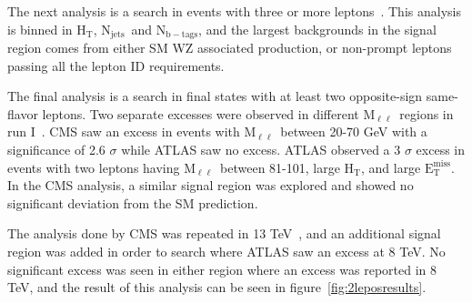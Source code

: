 \documentclass{article}
\newcommand{\MET}{${\mathrm{E_{T}^{miss}}}$}
\newcommand{\HT}{$\mathrm{H_T}$}
\newcommand{\njets}{$\mathrm{N_{jets}}$}
\newcommand{\nbtags}{$\mathrm{N_{b-tags}}$}
\newcommand{\mll}{$\mathrm{M_{\ell\ell}}$}
\begin{document}


The next analysis is a search in events with three or more leptons~\cite{multilep2015}.
This analysis is binned in \HT, \njets\ and \nbtags,
and the largest backgrounds in the signal region comes from either SM WZ associated production,
or non-prompt leptons passing all the lepton ID requirements.

The final analysis is a search in final states with at least two opposite-sign same-flavor leptons.
Two separate excesses were observed in different \mll\ regions in run I~\cite{CMSedge,ATLASZPAPER}.
CMS saw an excess in events with \mll\ between 20-70 GeV with a significance of 2.6 $\sigma$ while ATLAS saw no excess.
ATLAS observed a 3 $\sigma$ excess in events with two leptons having \mll\ between 81-101, large \HT, and large \MET.
In the CMS analysis, a similar signal region was explored and showed no significant deviation from the SM prediction.

The analysis done by CMS was repeated in 13 TeV~\cite{osdilep2015}, and an additional signal region was added in order to search where ATLAS saw an excess at 8 TeV.
No significant excess was seen in either region where an excess was reported in 8 TeV, and the result of this analysis can be seen in figure~\ref{fig:2leposresults}.
\end{document}
